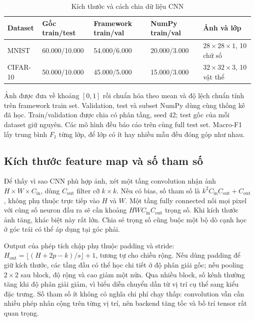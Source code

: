 \documentclass[12pt,a4paper]{report}
\begin{document}
\begin{table}[htbp]\centering\caption{Kích thước và cách chia dữ liệu CNN}\label{tab:cnn-splits}
\footnotesize\begin{tabularx}{\textwidth}{p{1.7cm}p{2.2cm}p{2.3cm}p{2.3cm}X}
\toprule\textbf{Dataset} & \textbf{Gốc train/test} & \textbf{Framework train/val} & \textbf{NumPy train/val} & \textbf{Ảnh và lớp}\\\midrule
MNIST & 60.000/10.000 & 54.000/6.000 & 20.000/3.000 & $28\times28\times1$, 10 chữ số\\
CIFAR-10 & 50.000/10.000 & 45.000/5.000 & 15.000/3.000 & $32\times32\times3$, 10 vật thể\\
\bottomrule\end{tabularx}\end{table}

Ảnh được đưa về khoảng $[0,1]$ rồi chuẩn hóa theo mean và độ lệch chuẩn tính trên framework train set. Validation, test và subset NumPy dùng cùng thống kê đã học. Train/validation được chia có phân tầng, seed 42; test gốc của mỗi dataset giữ nguyên. Các mô hình đều báo cáo trên cùng full test set. Macro-F1 lấy trung bình $F_1$ từng lớp, để lớp có ít hay nhiều mẫu đều đóng góp như nhau.

\subsection{Kích thước feature map và số tham số}
Để thấy vì sao CNN phù hợp ảnh, xét một tầng convolution nhận ảnh $H\times W\times C_{\mathrm{in}}$, dùng $C_{\mathrm{out}}$ filter cỡ $k\times k$. Nếu có bias, số tham số là $k^2C_{\mathrm{in}}C_{\mathrm{out}}+C_{\mathrm{out}}$, không phụ thuộc trực tiếp vào $H$ và $W$. Một tầng fully connected nối mọi pixel với cùng số neuron đầu ra sẽ cần khoảng $HWC_{\mathrm{in}}C_{\mathrm{out}}$ trọng số. Khi kích thước ảnh tăng, khác biệt này rất lớn. Chia sẻ trọng số cũng buộc một bộ dò cạnh học ở góc trái có thể áp dụng tại góc phải.

Output của phép tích chập phụ thuộc padding và stride: $H_{\mathrm{out}}=\lfloor(H+2p-k)/s\rfloor+1$, tương tự cho chiều rộng. Nếu dùng padding để giữ kích thước, các tầng đầu có thể học chi tiết ở độ phân giải gốc; nếu pooling $2\times2$ sau block, độ rộng và cao giảm một nửa. Qua nhiều block, số kênh thường tăng khi độ phân giải giảm, vì biểu diễn chuyển dần từ vị trí cụ thể sang kiểu đặc trưng. Số tham số ít không có nghĩa chi phí chạy thấp: convolution vẫn cần nhiều phép nhân cộng trên từng vị trí, nên backend tăng tốc và bố trí tensor rất quan trọng.
\end{document}

